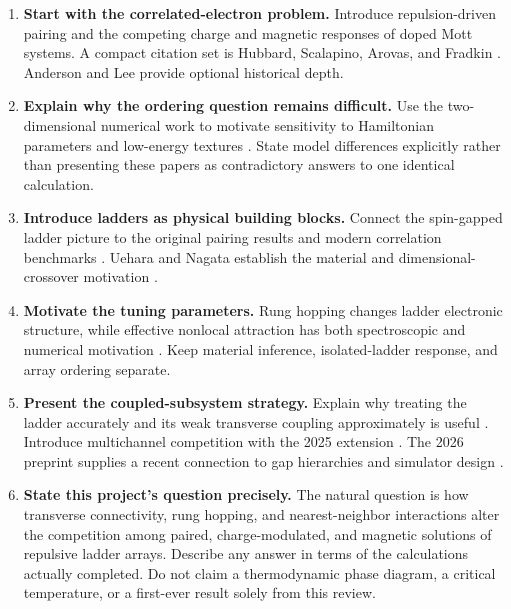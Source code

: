 \documentclass[11pt]{article}
\begin{document}
\begin{enumerate}
\item \textbf{Start with the correlated-electron problem.} Introduce repulsion-driven pairing and the competing charge and magnetic responses of doped Mott systems. A compact citation set is Hubbard, Scalapino, Arovas, and Fradkin \citep{Hubbard1963,Scalapino2012,Arovas2022,Fradkin2015}. Anderson and Lee provide optional historical depth.
\item \textbf{Explain why the ordering question remains difficult.} Use the two-dimensional numerical work to motivate sensitivity to Hamiltonian parameters and low-energy textures \citep{Zheng2017,Qin2020,Xu2024}. State model differences explicitly rather than presenting these papers as contradictory answers to one identical calculation.
\item \textbf{Introduce ladders as physical building blocks.} Connect the spin-gapped ladder picture to the original pairing results and modern correlation benchmarks \citep{DagottoRice1996,BalentsFisher1996,Dolfi2015,Shen2023}. Uehara and Nagata establish the material and dimensional-crossover motivation \citep{Uehara1996,Nagata1998}.
\item \textbf{Motivate the tuning parameters.} Rung hopping changes ladder electronic structure, while effective nonlocal attraction has both spectroscopic and numerical motivation \citep{Noack1997,Chen2021,Padma2025,Zhou2023,Peng2023}. Keep material inference, isolated-ladder response, and array ordering separate.
\item \textbf{Present the coupled-subsystem strategy.} Explain why treating the ladder accurately and its weak transverse coupling approximately is useful \citep{Arrigoni2004,Bollmark2020,Bollmark2023}. Introduce multichannel competition with the 2025 extension \citep{Bollmark2025}. The 2026 preprint supplies a recent connection to gap hierarchies and simulator design \citep{Kohler2026}.
\item \textbf{State this project's question precisely.} The natural question is how transverse connectivity, rung hopping, and nearest-neighbor interactions alter the competition among paired, charge-modulated, and magnetic solutions of repulsive ladder arrays. Describe any answer in terms of the calculations actually completed. Do not claim a thermodynamic phase diagram, a critical temperature, or a first-ever result solely from this review.
\end{enumerate}
\end{document}
